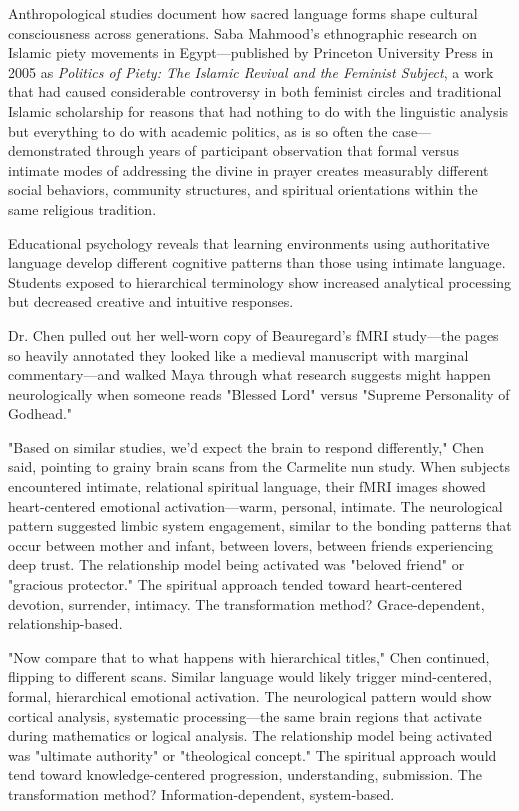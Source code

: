 \documentclass[12pt,twoside]{book}
\begin{document}
Anthropological studies document how sacred language forms shape cultural consciousness across generations. Saba Mahmood's ethnographic research on Islamic piety movements in Egypt—published by Princeton University Press in 2005 as \emph{Politics of Piety: The Islamic Revival and the Feminist Subject}, a work that had caused considerable controversy in both feminist circles and traditional Islamic scholarship for reasons that had nothing to do with the linguistic analysis but everything to do with academic politics, as is so often the case—demonstrated through years of participant observation that formal versus intimate modes of addressing the divine in prayer creates measurably different social behaviors, community structures, and spiritual orientations within the same religious tradition.

Educational psychology reveals that learning environments using authoritative language develop different cognitive patterns than those using intimate language. Students exposed to hierarchical terminology show increased analytical processing but decreased creative and intuitive responses.

Dr. Chen pulled out her well-worn copy of Beauregard's fMRI study—the pages so heavily annotated they looked like a medieval manuscript with marginal commentary—and walked Maya through what research suggests might happen neurologically when someone reads "Blessed Lord" versus "Supreme Personality of Godhead."

"Based on similar studies, we'd expect the brain to respond differently," Chen said, pointing to grainy brain scans from the Carmelite nun study. When subjects encountered intimate, relational spiritual language, their fMRI images showed heart-centered emotional activation—warm, personal, intimate. The neurological pattern suggested limbic system engagement, similar to the bonding patterns that occur between mother and infant, between lovers, between friends experiencing deep trust. The relationship model being activated was "beloved friend" or "gracious protector." The spiritual approach tended toward heart-centered devotion, surrender, intimacy. The transformation method? Grace-dependent, relationship-based.

"Now compare that to what happens with hierarchical titles," Chen continued, flipping to different scans. Similar language would likely trigger mind-centered, formal, hierarchical emotional activation. The neurological pattern would show cortical analysis, systematic processing—the same brain regions that activate during mathematics or logical analysis. The relationship model being activated was "ultimate authority" or "theological concept." The spiritual approach would tend toward knowledge-centered progression, understanding, submission. The transformation method? Information-dependent, system-based.
\end{document}
